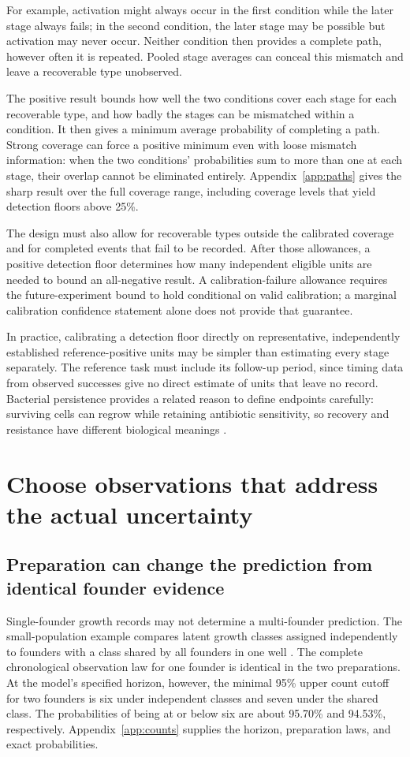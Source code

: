 \documentclass[11pt]{article}
\begin{document}
For example, activation might always occur in the first condition while the later stage always fails; in the second condition, the later stage may be possible but activation may never occur. Neither condition then provides a complete path, however often it is repeated. Pooled stage averages can conceal this mismatch and leave a recoverable type unobserved.

The positive result bounds how well the two conditions cover each stage for each recoverable type, and how badly the stages can be mismatched within a condition. It then gives a minimum average probability of completing a path. Strong coverage can force a positive minimum even with loose mismatch information: when the two conditions' probabilities sum to more than one at each stage, their overlap cannot be eliminated entirely. Appendix~\ref{app:paths} gives the sharp result over the full coverage range, including coverage levels that yield detection floors above 25\%.

The design must also allow for recoverable types outside the calibrated coverage and for completed events that fail to be recorded. After those allowances, a positive detection floor determines how many independent eligible units are needed to bound an all-negative result. A calibration-failure allowance requires the future-experiment bound to hold conditional on valid calibration; a marginal calibration confidence statement alone does not provide that guarantee.

In practice, calibrating a detection floor directly on representative, independently established reference-positive units may be simpler than estimating every stage separately. The reference task must include its follow-up period, since timing data from observed successes give no direct estimate of units that leave no record. Bacterial persistence provides a related reason to define endpoints carefully: surviving cells can regrow while retaining antibiotic sensitivity, so recovery and resistance have different biological meanings \citep{balaban}.

\section{Choose observations that address the actual uncertainty}
\subsection{Preparation can change the prediction from identical founder evidence}
Single-founder growth records may not determine a multi-founder prediction. The small-population example compares latent growth classes assigned independently to founders with a class shared by all founders in one well \citep{C}. The complete chronological observation law for one founder is identical in the two preparations. At the model's specified horizon, however, the minimal 95\% upper count cutoff for two founders is six under independent classes and seven under the shared class. The probabilities of being at or below six are about 95.70\% and 94.53\%, respectively. Appendix~\ref{app:counts} supplies the horizon, preparation laws, and exact probabilities.
\end{document}

